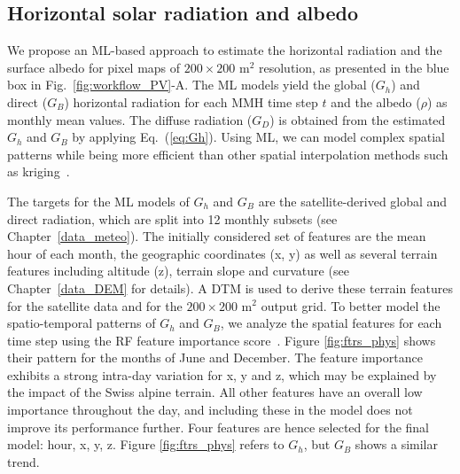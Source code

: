 \subsection{Horizontal solar radiation and albedo}
\label{irrad}

We propose an ML-based approach to estimate the horizontal radiation and the surface albedo for pixel maps of $200 \times 200$ m$^2$ resolution, as presented in the blue box in Fig.~\ref{fig:workflow_PV}-A.
The ML models yield the global ($G_h$) and direct ($G_B$) horizontal radiation for each MMH time step $t$ and the albedo ($\rho$) as monthly mean values. 
The diffuse radiation ($G_D$) is obtained from the estimated $G_h$ and $G_B$ by applying Eq.~(\ref{eq:Gh}). 
Using ML, we can model complex spatial patterns while being more efficient than other spatial interpolation methods such as kriging~\cite{rehman_spatial_2000}. 

The targets for the ML models of $G_h$ and $G_B$ are the satellite-derived global and direct radiation, which are split into 12 monthly subsets (see Chapter~\ref{data_meteo}).
The initially considered set of features are the mean hour of each month, the geographic coordinates (x, y) as well as several terrain features including altitude (z), terrain slope and curvature \cite{robert_spatial_2012} (see Chapter~\ref{data_DEM} for details). 
A DTM is used to derive these terrain features for the satellite data and for the $200 \times 200$ m$^2$ output grid. 
To better model the spatio-temporal patterns of $G_h$ and $G_B$, we analyze the spatial features for each time step using the RF feature importance score~\cite{pedregosa_scikit-learn:_2011}.
Figure \ref{fig:ftrs_phys} shows their pattern for the months of June and December.
The feature importance exhibits a strong intra-day variation for x, y and z, which may be explained by the impact of the Swiss alpine terrain. All other features have an overall low importance throughout the day, and including these in the model does not improve its performance further.
Four features are hence selected for the final model: hour, x, y, z.
Figure \ref{fig:ftrs_phys} refers to $G_h$, but $G_B$ shows a similar trend.

